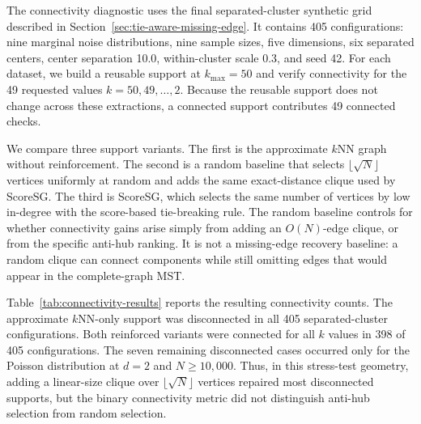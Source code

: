 \documentclass[11pt]{article}
\begin{document}
The connectivity diagnostic uses the final separated-cluster synthetic grid described in Section~\ref{sec:tie-aware-missing-edge}. It contains 405 configurations: nine marginal noise distributions, nine sample sizes, five dimensions, six separated centers, center separation 10.0, within-cluster scale 0.3, and seed 42. For each dataset, we build a reusable support at \(k_{\max}=50\) and verify connectivity for the 49 requested values \(k=50,49,\ldots,2\). Because the reusable support does not change across these extractions, a connected support contributes 49 connected checks.

We compare three support variants. The first is the approximate \(k\)NN graph without reinforcement. The second is a random baseline that selects \(\lfloor\sqrt{N}\rfloor\) vertices uniformly at random and adds the same exact-distance clique used by ScoreSG. The third is ScoreSG, which selects the same number of vertices by low in-degree with the score-based tie-breaking rule. The random baseline controls for whether connectivity gains arise simply from adding an \(O(N)\)-edge clique, or from the specific anti-hub ranking. It is not a missing-edge recovery baseline: a random clique can connect components while still omitting edges that would appear in the complete-graph MST.

Table~\ref{tab:connectivity-results} reports the resulting connectivity counts. The approximate \(k\)NN-only support was disconnected in all 405 separated-cluster configurations. Both reinforced variants were connected for all \(k\) values in 398 of 405 configurations. The seven remaining disconnected cases occurred only for the Poisson distribution at \(d=2\) and \(N\geq 10{,}000\). Thus, in this stress-test geometry, adding a linear-size clique over \(\lfloor\sqrt{N}\rfloor\) vertices repaired most disconnected supports, but the binary connectivity metric did not distinguish anti-hub selection from random selection.

\begin{table}[H]
\centering
\caption{Connectivity diagnostics for reusable support graphs over \(k=50,\ldots,2\). The random baseline adds a clique over \(\lfloor\sqrt{N}\rfloor\) uniformly selected vertices; ScoreSG adds a clique over the same number of anti-hubs. Each connected configuration supports all 49 requested extractions.}
\label{tab:connectivity-results}
\end{table}
\end{document}
